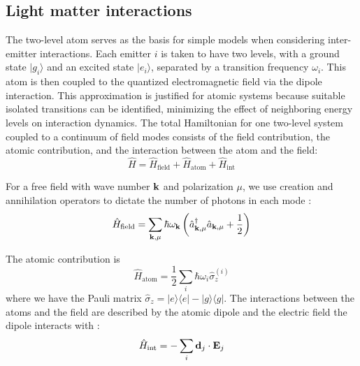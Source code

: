 \documentclass{article}
\begin{document}
\subsection{Light matter interactions}

The two-level atom serves as the basis for simple models when considering
inter-emitter interactions. Each emitter $i$ is taken to have two levels, with a ground
state $|g_i\rangle$ and an excited state $|e_i\rangle$, separated by a transition
frequency $\omega_i$. This atom is then coupled to the quantized electromagnetic field
via the dipole interaction. This approximation is justified for atomic systems because
suitable isolated transitions can be identified, minimizing the effect of neighboring
energy levels on interaction dynamics. The total Hamiltonian for one two-level system
coupled to a continuum of field modes consists of the field contribution, the atomic
contribution, and the interaction between the atom and the field:
\begin{equation}
  \hat{H} = \hat{H}_{\mathrm{field}} + \hat{H}_{\mathrm{atom}} + \hat{H}_{\mathrm{int}}
\end{equation}

For a free field with wave number ${\bf k}$ and polarization $\mu$, we use creation
and annihilation operators to dictate the number of photons in each mode
\cite{cohen-tannoudji_atom-photon_1992, buhmann_dispersion_2013}:
\begin{equation}
\hat{H}_{\mathrm{field}} = \sum_{{\bf k},\mu} \hbar \omega_{\bf k}\left(\hat{a}_{{\bf
k},\mu}^\dagger
\hat{a}_{{\bf k},\mu}+\frac{1}{2}\right)
\end{equation}

The atomic contribution is
\begin{equation}
  \hat{H}_{\mathrm{atom}} = \frac{1}{2}\sum_i \hbar\omega_i\hat{\sigma}_z^{(i)}
\end{equation}
where we have the Pauli matrix $\hat{\sigma}_z = |e\rangle\langle e|-|g\rangle\langle
g|$.
The interactions between the atoms and the field are described by the atomic dipole
and the electric field the dipole interacts with \cite{buhmann_dispersion_2013,knoll_qed_2000,dung_resonant_2002}:
\begin{equation}
  \hat{H}_{\mathrm{int}} = -\sum_i {\bf d}_j\cdot{\bf E}_j
\end{equation}
\end{document}
